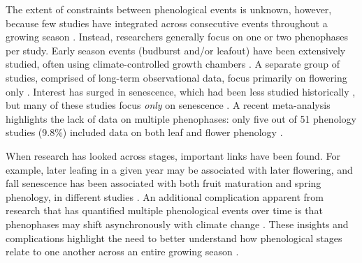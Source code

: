 \documentclass{article}
\begin{document}
\par The extent of constraints between phenological events is unknown, however, because few studies have integrated across consecutive events throughout a growing season \citep{wolkovich2014}. Instead, researchers generally focus on one or two phenophases per study. Early season events (budburst and/or leafout) have been extensively studied, often using climate-controlled growth chambers \citep[e.g.,][]{basler2012,laube2014}. A separate group of studies, comprised of long-term observational data, focus primarily on flowering only  \citep[e.g.,] []{fitter2002,millerrushing2008}. Interest has surged in senescence, which had been less studied historically \citep {parmesan2006}, but many of these studies focus \textit{only} on senescence \citep[e.g.,][]{taylor2008,archetti2013,jeong2014}. A recent meta-analysis highlights the lack of data on multiple phenophases: only five out of 51 phenology studies (9.8\%) included data on both leaf and flower phenology \citep{wolkovich2012}. 

\par When research has looked across stages, important links have been found. For example, later leafing in a given year may be associated with later flowering, and fall senescence has been associated with both fruit maturation and spring phenology, in different studies \citep{lechowicz1995,keenan2015,liu2016}. An additional complication apparent from research that has quantified multiple phenological events over time is that phenophases may shift asynchronously with climate change \citep[e.g., spring events are occurring earlier as fall events have gotten later, first-flower dates have shifted earlier whereas last-flower dates have not][]{menzel2006,caradonna2014}. These insights and complications highlight the need to better understand how phenological stages relate to one another across an entire growing season \citep{wolkovich2014}.
\end{document}
